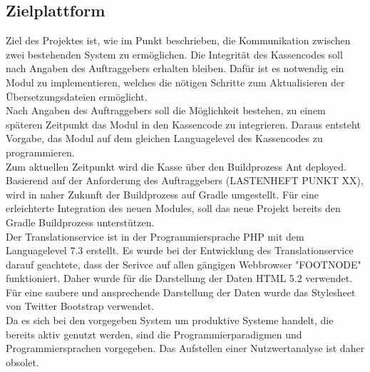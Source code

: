 \documentclass[10pt, oneside]{article}
\newcommand{\secref}[1]{\hyperref[{#1}]{\nameref{#1}}}
\begin{document}
    \subsection{Zielplattform}%
      Ziel des Projektes ist, wie im Punkt \secref{sec:projectdesc} beschrieben, die Kommunikation zwischen zwei bestehenden System zu ermöglichen.
      Die Integrität des Kassencodes soll nach Angaben des Auftraggebers erhalten bleiben. Dafür ist es notwendig ein Modul zu implementieren, welches 
      die nötigen Schritte zum Aktualisieren der Übersetzungsdateien ermöglicht.\\
      Nach Angaben des Auftraggebers soll die Möglichkeit bestehen, zu einem späteren Zeitpunkt das Modul in den Kassencode zu integrieren. Daraus entsteht 
      Vorgabe, das Modul auf dem gleichen Languagelevel des Kassencodes zu programmieren.\\
      Zum aktuellen Zeitpunkt wird die Kasse über den Buildprozess Ant deployed. Basierend auf der Anforderung des Auftraggebers (LASTENHEFT PUNKT XX),
      wird in naher Zukunft der Buildprozess auf Gradle umgestellt. Für eine erleichterte Integration des neuen Modules, soll das neue Projekt bereits den Gradle 
      Buildprozess unterstützen.\\
      Der Translationservice ist in der Programmiersprache PHP mit dem Languagelevel 7.3 erstellt. Es wurde bei der Entwicklung des Translationservice darauf geachtete,
      dass der Serivce auf allen gängigen Webbrowser "FOOTNODE" funktioniert. Daher wurde für die Darstellung der Daten HTML 5.2 verwendet. Für eine saubere und ansprechende 
      Darstellung der Daten wurde das Stylesheet von Twitter Bootstrap verwendet.\\
      Da es sich bei den vorgegeben System um produktive Systeme handelt, die bereits aktiv genutzt werden, sind die Programmierparadigmen und Programmiersprachen vorgegeben.
      Das Aufstellen einer Nutzwertanalyse ist daher obsolet.
\end{document}
